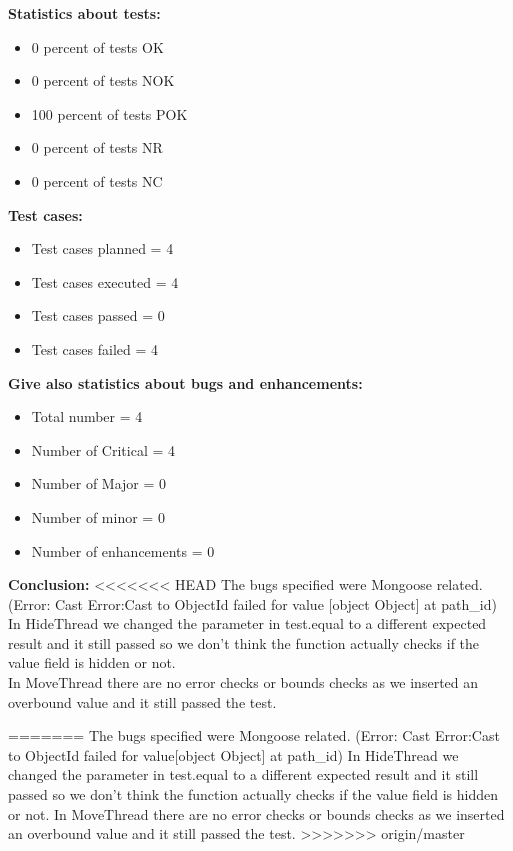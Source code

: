 \begin{flushleft}
\begin{flushleft}
\textbf{Statistics about tests:}
\begin{itemize}
  	\item  0 percent of tests OK
  	\item  0 percent of tests NOK
   	\item 100 percent of tests POK
    	\item 	0 percent of tests NR
        	\item 	0 percent of tests NC
 \end{itemize}

\textbf{Test cases:}
\begin{itemize}
  	\item Test cases planned = 4 
  	\item  Test cases executed = 4
   	\item Test cases passed = 0
    	\item Test cases failed = 4
 \end{itemize}

\textbf{Give also statistics about bugs and enhancements:}
\begin{itemize}
  	\item 	Total number = 4
  	\item  	Number of Critical = 4
   	\item 	Number of Major = 0
    	\item Number of minor = 0
      	\item Number of enhancements = 0
 \end{itemize}
 \end{flushleft}
 
\begin{flushleft}
\textbf{Conclusion:}
<<<<<<< HEAD
The bugs specified were Mongoose related. (Error: Cast Error:Cast to ObjectId failed for value [object Object] at path\_id)\\
In HideThread we changed the parameter in test.equal to a different expected result and it still passed so we don’t think the function actually checks if the value field is hidden or not.\\
In MoveThread there are no error checks or bounds checks as we inserted an overbound value and it still passed the test.
\end{flushleft}
=======
The bugs specified were Mongoose related. (Error: Cast Error:Cast to ObjectId failed for value[object Object] at path_id)
In HideThread we changed the parameter in test.equal to a different expected result and it still passed so we don’t think the function actually checks if the value field is hidden or not.
In MoveThread there are no error checks or bounds checks as we inserted an overbound value and it still passed the test. 
>>>>>>> origin/master

\end{flushleft}


